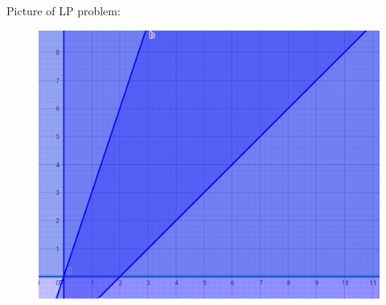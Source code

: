\begin{solution}
    Picture of LP problem:
    \begin{figure}[H]
        \centering
        \includegraphics[scale = 0.3]{Screenshot_20240305_083205_Chrome.jpg}
        \label{LP wrong}
    \end{figure}
\end{solution}

